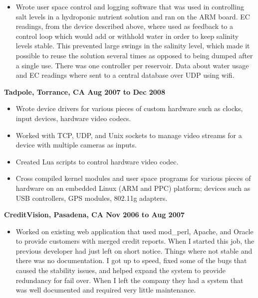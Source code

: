 \documentclass{res}
\begin{document}
\begin{resume}
\begin{itemize}
\item
	Wrote user space control and logging software that was used in
	controlling salt levels in a hydroponic nutrient solution and
	ran on the ARM board.  EC readings, from the device described
	above, where used as feedback to a control loop which would add
	or withhold water in order to keep salinity levels stable.
	This prevented large swings in the salinity level, which made
	it possible to reuse the solution several times as opposed to
	being dumped after a single use.  There was one controller per
	reservoir.  Data about water usage and EC readings where sent
	to a central database over UDP using wifi.


\end{itemize}

{\large \bf Tadpole, Torrance, CA \hfill Aug 2007 to Dec 2008}

\begin{itemize}

\item
	Wrote device drivers for various pieces of custom hardware such
	as clocks, input devices, hardware video codecs.

\item
	Worked with TCP, UDP, and Unix sockets to manage video streams
	for a device with multiple cameras as inputs.

\item
	Created Lua scripts to control hardware video codec.

\item
	Cross compiled kernel modules and user space programs for various
	pieces of hardware on an embedded Linux (ARM and PPC) platform;
	devices such as USB controllers, GPS modules, 802.11g adapters.

\end{itemize}

{\large \bf CreditVision, Pasadena, CA \hfill Nov 2006 to Aug 2007}

\begin{itemize}

\item
	Worked on existing web application that used mod\_perl, Apache,
	and Oracle to provide customers with merged credit reports.
	When I started this job, the previous developer had just
	left on short notice.  Things where not stable and there was
	no documentation.  I got up to speed, fixed some of the bugs
	that caused the stability issues, and helped expand the system
	to provide redundancy for fail over.  When I left the company
	they had a system that was well documented and required very
	little maintenance.


\end{itemize}
\end{resume}
\end{document}
